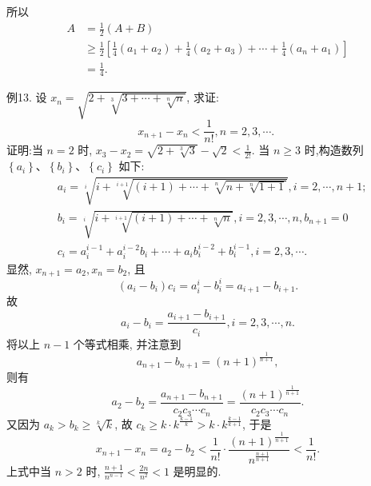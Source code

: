 所以
$$
\begin{aligned}
A & =\frac{1}{2}(A+B) \\
& \geqslant \frac{1}{2}\left[\frac{1}{4}\left(a_1+a_2\right)+\frac{1}{4}\left(a_2+a_3\right)+\cdots+\frac{1}{4}\left(a_n+a_1\right)\right] \\
& =\frac{1}{4} .
\end{aligned}
$$



例13. 设 $x_n=\sqrt{2+\sqrt[3]{3+\cdots+\sqrt[n]{n}}}$, 求证:
$$
x_{n+1}-x_n<\frac{1}{n !}, n=2,3, \cdots \text {. }
$$
证明:当 $n=2$ 时, $x_3-x_2=\sqrt{2+\sqrt[3]{3}}-\sqrt{2}<\frac{1}{2 !}$.
当 $n \geqslant 3$ 时,构造数列 $\left\{a_i\right\} 、\left\{b_i\right\} 、\left\{c_i\right\}$ 如下:
$$
\begin{aligned}
& a_i=\sqrt[i]{i+\sqrt[i+1]{(i+1)+\cdots+\sqrt[n]{n+\sqrt[n]{1+1}}}}, i=2, \cdots, n+1 ; \\
& b_i=\sqrt[i]{i+\sqrt[i+1]{(i+1)+\cdots+\sqrt[n]{n}}}, i=2,3, \cdots, n, b_{n+1}=0 \\
& c_i=a_i^{i-1}+a_i^{i-2} b_i+\cdots+a_i b_i^{i-2}+b_i^{i-1}, i=2,3, \cdots .
\end{aligned}
$$
显然, $x_{n+1}=a_2, x_n=b_2$, 且
$$
\left(a_i-b_i\right) c_i=a_i^i-b_i^i=a_{i+1}-b_{i+1} .
$$
故
$$
a_i-b_i=\frac{a_{i+1}-b_{i+1}}{c_i}, i=2,3, \cdots, n .
$$
将以上 $n-1$ 个等式相乘, 并注意到
$$
a_{n+1}-b_{n+1}=(n+1)^{\frac{1}{n+1}},
$$
则有
$$
a_2-b_2=\frac{a_{n+1}-b_{n+1}}{c_2 c_3 \cdots c_n}=\frac{(n+1)^{\frac{1}{n+1}}}{c_2 c_3 \cdots c_n} .
$$
又因为 $a_k>b_k \geqslant \sqrt[k]{k}$, 故 $c_k \geqslant k \cdot k^{\frac{k-1}{k}}>k \cdot k^{\frac{k-1}{k+1}}$, 于是
$$
x_{n+1}-x_n=a_2-b_2<\frac{1}{n !} \cdot \frac{(n+1)^{\frac{1}{n+1}}}{n^{\frac{n+1}{n+1}}}<\frac{1}{n !} .
$$
上式中当 $n>2$ 时, $\frac{n+1}{n^{n-1}}<\frac{2 n}{n^2}<1$ 是明显的.



